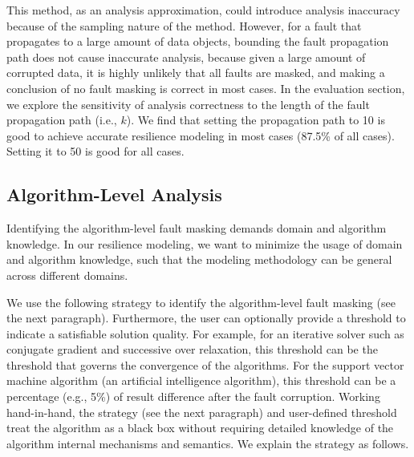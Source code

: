 This method, as an analysis approximation, could introduce analysis inaccuracy because of the sampling nature of the method. 
However, for a fault that propagates to a large amount of data objects, 
bounding the fault propagation path does not cause inaccurate analysis, because given a large amount of corrupted data, it is highly unlikely that all faults are masked, and
making a conclusion of no fault masking is correct in most cases.
In the evaluation section, we explore the sensitivity of analysis correctness to the length of the fault propagation path (i.e., $k$). We find that setting the propagation path to 10 is
good to achieve accurate resilience modeling in most cases (87.5\% of all cases). Setting it to 50 is good for all cases.

\vspace{-10pt}
\subsection{Algorithm-Level Analysis}
\label{sec:algo_analysis}
Identifying the algorithm-level fault masking demands domain and algorithm knowledge.  
In our resilience modeling, we want to minimize the usage of domain and algorithm knowledge, such that
the modeling methodology can be general across different domains.


We use the following strategy to identify the algorithm-level fault masking (see the next paragraph). 
Furthermore, the user can optionally provide a threshold to indicate a satisfiable solution quality.
For example, for an iterative solver such as conjugate gradient and successive over relaxation,
this threshold can be the threshold that governs the convergence of the algorithms.
For the support vector machine algorithm (an artificial intelligence algorithm), this threshold can be a percentage (e.g., 5\%)
of result difference after the fault corruption.
Working hand-in-hand, the strategy (see the next paragraph) and user-defined threshold treat the algorithm as a black box without
requiring detailed knowledge of the algorithm internal mechanisms and semantics. 
We explain the strategy as follows.

